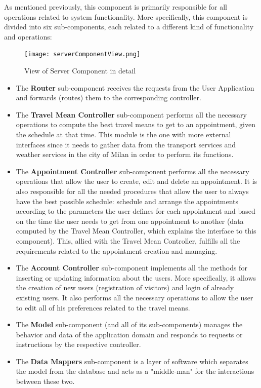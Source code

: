 \documentclass[12pt]{article}
\begin{document}
As mentioned previously, this component is primarily responsible for all operations related to system functionality. More specifically, this component is divided into six sub-components, each related to a different kind of functionality and operations:
\begin{figure}[H]
    \centering
    \texttt{[image: serverComponentView.png]}
    \caption{View of Server Component in detail}
    \label{fig:componentView}
\end{figure}
\begin{itemize}
    \item The \textbf{Router} sub-component receives the requests from the User Application and forwards (routes) them to the corresponding controller.
    \item The \textbf{Travel Mean Controller} sub-component performs all the necessary operations to compute the best travel means to get to an appointment, given the schedule at that time. This module is the one with more external interfaces since it needs to gather data from the transport services and weather services in the city of Milan in order to perform its functions.
    \item The \textbf{Appointment Controller} sub-component performs all the necessary operations that allow the user to create, edit and delete an appointment. It is also responsible for all the needed procedures that allow the user to always have the best possible schedule: schedule and arrange the appointments according to the parameters the user defines for each appointment and based on the time the user needs to get from one appointment to another (data computed by the Travel Mean Controller, which explains the interface to this component). This, allied with the Travel Mean Controller, fulfills all the requirements related to the appointment creation and managing.
    \item The \textbf{Account Controller} sub-component implements all the methods for inserting or updating information about the users. More specifically, it allows the creation of new users (registration of visitors) and login of already existing users. It also performs all the necessary operations to allow the user to edit all of his preferences related to the travel means.
    \item The \textbf{Model} sub-component (and all of its sub-components) manages the behavior and data of the application domain and responds to requests or instructions by the respective controller.
    \item The \textbf{Data Mappers} sub-component is a layer of software which separates the model from the database and acts as a "middle-man" for the interactions between these two.
\end{itemize}
\end{document}
